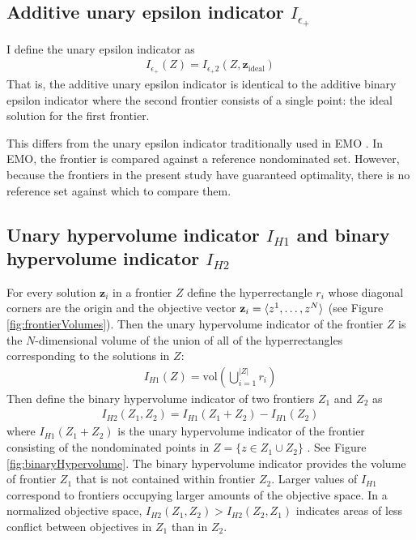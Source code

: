 \subsection{Additive unary epsilon indicator $I_{\epsilon_+}$} I define the unary epsilon indicator as
\begin{align}
I_{\epsilon_+} (Z) = I_{\epsilon_+2} (Z,\mathbf{z}_{\text{ideal}})
\end{align}
That is, the additive unary epsilon indicator is identical to the additive binary epsilon indicator where the second frontier consists of a single point: the ideal solution for the first frontier.

This differs from the unary epsilon indicator traditionally used in EMO \cite{zitzler2003performance}. In EMO, the frontier is compared against a reference nondominated set. However, because the frontiers in the present study have guaranteed optimality, there is no reference set against which to compare them.

\subsection{Unary hypervolume indicator $I_{H1}$ and binary hypervolume indicator $I_{H2}$}
\label{sec:hypervolumeIndicator}
For every solution $\mathbf{z}_i$ in a frontier $Z$ define the hyperrectangle $r_i$ whose diagonal corners are the origin and the objective vector $\mathbf{z}_i = \braket{z^1,\ldots,z^N}$ (see Figure \ref{fig:frontierVolumes}). Then the unary hypervolume indicator of the frontier $Z$ is the $N$-dimensional volume of the union of all of the hyperrectangles corresponding to the solutions in $Z$:
\begin{align}
I_{H1} (Z) = \text{vol} \left( \bigcup_{i = 1}^{|Z|} r_i \right)
\end{align}
Then define the binary hypervolume indicator of two frontiers $Z_1$ and $Z_2$ as \cite{zitzler1999evolutionary}
\begin{align}
I_{H2} (Z_1,Z_2) = I_{H1} (Z_1 + Z_2) - I_{H1} (Z_2)
\end{align}
where $I_{H1} (Z_1 + Z_2)$ is the unary hypervolume indicator of the frontier consisting of the nondominated points in $Z = \{z \in Z_1 \cup Z_2\}$ . See Figure \ref{fig:binaryHypervolume}. The binary hypervolume indicator provides the volume of frontier $Z_1$ that is not contained within frontier $Z_2$. Larger values of $I_{H1}$ correspond to frontiers occupying larger amounts of the objective space. In a normalized objective space, $I_{H2}(Z_1, Z_2) > I_{H2}(Z_2, Z_1)$ indicates areas of less conflict between objectives in $Z_1$ than in $Z_2$.


